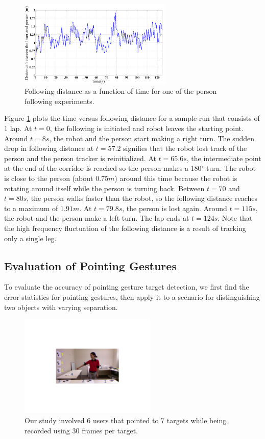 \documentclass{tADR2e}
\begin{document}
\begin{figure}[ht!]
\centering
\includegraphics[width=0.65\textwidth]{pics/following_result}
\caption{Following distance as a function of time for one of the person following experiments.}
\label{fig:graph}
\end{figure}

Figure \ref{fig:graph} plots the time versus following distance for a sample run that consists of 1 lap. At $t=0$, the following is initiated and robot leaves the starting point. Around $t=8s$, the robot and the person start making a right turn. The sudden drop in following distance at $t=57.2$ signifies that the robot lost track of the person and the person tracker is reinitialized. At $t=65.6s$, the intermediate point at the end of the corridor is reached so the person makes a 180$^\circ$ turn. The robot is close to the person (about $0.75m$) around this time because the robot is rotating around itself while the person is turning back. Between $t=70$ and $t=80s$, the person walks faster than the robot, so the following distance reaches to a maximum of $1.91m$. At $t=79.8s$, the person is lost again. Around $t=115s$, the robot and the person make a left turn. The lap ends at $t=124s$. Note that the high frequency fluctuation of the following distance is a result of tracking only a single leg.


\subsection{Evaluation of Pointing Gestures}
\label{sec:eval_pointing_gestures}

To evaluate the accuracy of pointing gesture target detection, we first find the error statistics for pointing gestures, then apply it to a scenario for distinguishing two objects with varying separation.

\begin{figure}[thpb]
\centering
\includegraphics[width=65mm]{pics/data_collection_crop}
\caption{Our study involved 6 users that pointed to 7 targets while being recorded using 30 frames per target.}
\label{fig:ground_truth_targets}
\end{figure}
\end{document}
